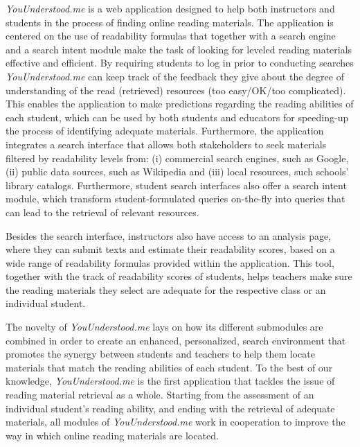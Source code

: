 \documentclass{sig-alternate-05-2015}
\begin{document}


\textit{YouUnderstood.me} is a web application designed to help  both instructors and students in the process of finding online reading materials. The application is centered on the use of readability formulas that together with a search engine and a search intent module make the task of looking for leveled reading materials effective and efficient. By requiring students to log in prior to conducting searches \textit{YouUnderstood.me} can keep track of the feedback they give about the degree of understanding of the read (retrieved) resources (too easy/OK/too complicated). This enables the application to make predictions regarding the reading abilities of each student, which can be used by both students and educators for speeding-up the process of identifying adequate materials. Furthermore, the application integrates a search interface that allows both stakeholders to seek materials filtered by readability levels from: (i) commercial search engines, such as Google, (ii) public data sources, such as Wikipedia and (iii) local resources, such schools' library catalogs. Furthermore, student search interfaces also offer a search intent module,
which transform student-formulated queries on-the-fly into queries that can lead to the retrieval of relevant resources. 


Besides the search interface, instructors also have access to an analysis page, where they can submit texts and estimate their readability scores, based on a wide range of readability formulas provided within the application. This tool, together with the track of readability scores of students, helps teachers make sure the reading materials they select are adequate for the respective class or an individual student.

The novelty of \textit{YouUnderstood.me} lays on how its different submodules are combined in order to create an enhanced, personalized, search environment that promotes the synergy between students and teachers to help them locate materials that match the reading abilities of each student.
To the best of our knowledge, \textit{YouUnderstood.me} is the first application that tackles the issue of reading material retrieval as a whole. Starting from the assessment of an individual student's reading ability, and ending with the retrieval of adequate materials, all modules of \textit{YouUnderstood.me} work in cooperation to improve the way in which online reading materials are located.
\end{document}
